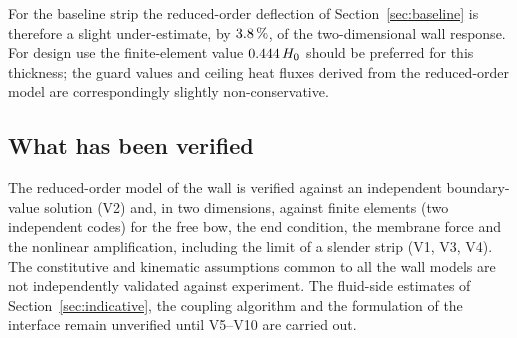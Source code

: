 For the baseline strip the reduced-order deflection of Section~\ref{sec:baseline} is therefore a slight under-estimate,
by $3.8\,\%$, of the two-dimensional wall response. For design use the finite-element value
$0.444\,H_0$ should be preferred for this thickness; the guard values and ceiling heat fluxes derived from the
reduced-order model are correspondingly slightly non-conservative.

\subsection{What has been verified}
The reduced-order model of the wall is verified against an independent boundary-value solution (V2) and, in
two dimensions, against finite elements (two independent codes) for the free bow, the end condition, the membrane force and the
nonlinear amplification, including the limit of a slender strip (V1, V3, V4). The constitutive and kinematic assumptions common to all
the wall models are not independently validated against experiment. The fluid-side estimates of Section~\ref{sec:indicative}, the coupling
algorithm and the formulation of the interface remain unverified until V5--V10 are carried out.
